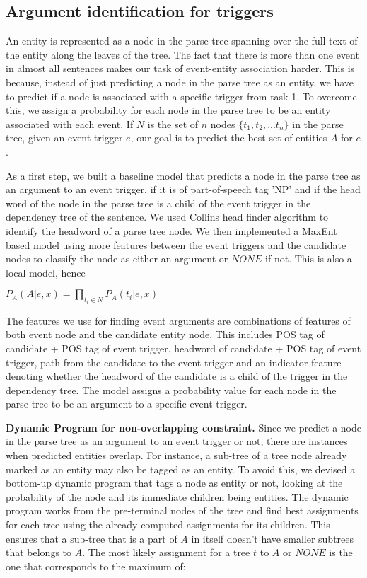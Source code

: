 \subsection{Argument identification for triggers}
An entity is represented as a node in the parse tree spanning over the full text of the entity along the leaves of the tree. The fact that there is more than one event in almost all sentences makes our task of event-entity association harder. This is because, instead of just predicting a node in the parse tree as an entity, we have to predict if a node is associated with a specific trigger from task 1. To overcome this, we assign a probability for each node in the parse tree to be an entity associated with each event. If $N$ is the set of $n$ nodes $\{t_1, t_2, ... t_n\}$ in the parse tree, given an event trigger $e$, our goal is to predict the best set of entities $A$ for $e$.

As a first step, we built a baseline model that predicts a node in the parse tree as an argument to an event trigger, if it is of part-of-speech tag 'NP' and if the head word of the node in the parse tree is a child of the event trigger in the dependency tree of the sentence. We used Collins head finder algorithm to identify the headword of a parse tree node. We then implemented a MaxEnt based model using more features between the event triggers and the candidate nodes to classify the node as either an argument or $NONE$ if not. This is also a local model, hence

$P_{A}(A | e, x) = \prod_{t_{i}\in N} P_{A}(t_{i} | e, x) $

The features we use for finding event arguments are combinations of features of both event node and the candidate entity node. This includes POS tag of candidate + POS tag of event trigger, headword of candidate + POS tag of event trigger, path from the candidate to the event trigger and an indicator feature denoting whether the headword of the candidate is a child of the trigger in the dependency tree. The model assigns a probability value for each node in the parse tree to be an argument to a specific event trigger.

{\bf Dynamic Program for non-overlapping constraint.} Since we predict a node in the parse tree as an argument to an event trigger or not, there are instances when predicted entities overlap. For instance, a sub-tree of a tree node already marked as an entity may also be tagged as an entity. To avoid this, we devised a bottom-up dynamic program that tags a node as entity or not, looking at the probability of the node and its immediate children being entities. The dynamic program works from the pre-terminal nodes of the tree and find best assignments for each tree using the already computed assignments for its children. This ensures that a sub-tree that is a part of $A$ in itself doesn't have smaller subtrees that belongs to $A$. The most likely assignment for a tree $t$  to $A$ or $NONE$ is the one that corresponds to the maximum of:

